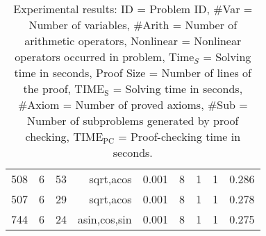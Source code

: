 \begin{table}[h!]
\begin{center}
\begin{tabular}{|l||r|r|r||r|r|r|r|r|}
508 & 6 & 53 & sqrt,acos & 0.001 & 8 & 1 & 1 & 0.286 \\
507 & 6 & 29 & sqrt,acos & 0.001 & 8 & 1 & 1 & 0.278 \\
744 & 6 & 24 & asin,cos,sin & 0.001 & 8 & 1 & 1 & 0.275\\
\hline
\end{tabular}
  \end{center}
  \caption{
    Experimental results:
    ID = Problem ID,
    \#Var = Number of variables,
    \#Arith = Number of arithmetic operators,
    Nonlinear = Nonlinear operators occurred in problem,
    Time$_S$ = Solving time in seconds,
    Proof Size = Number of lines of the proof,
    $\mathrm{TIME_S}$ = Solving time in seconds,
    \#Axiom = Number of proved axioms,
    \#Sub = Number of subproblems generated by proof checking,
    $\mathrm{TIME_{PC}}$ = Proof-checking time in seconds.
  }\label{tbl:exp}
\end{table}

